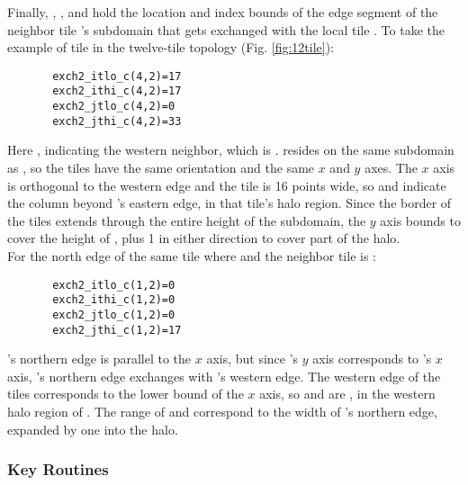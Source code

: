 Finally, ,
,
 and
 hold the location and index
bounds of the edge segment of the neighbor tile 's subdomain
that gets exchanged with the local tile .  To take the example
of tile  in the twelve-tile topology
(Fig. \ref{fig:12tile}): \\

\begin{verbatim}
       exch2_itlo_c(4,2)=17
       exch2_ithi_c(4,2)=17
       exch2_jtlo_c(4,2)=0
       exch2_jthi_c(4,2)=33
\end{verbatim}
 
Here , indicating the western neighbor, which is
.   resides on the same subdomain as , so
the tiles have the same orientation and the same $x$ and $y$ axes.
The $x$ axis is orthogonal to the western edge and the tile is 16
points wide, so  and 
indicate the column beyond 's eastern edge, in that tile's
halo region. Since the border of the tiles extends through the entire
height of the subdomain, the $y$ axis bounds  to
 cover the height of , plus 1 in
either direction to cover part of the halo. \\

For the north edge of the same tile  where  and 
the neighbor tile is :

\begin{verbatim}
       exch2_itlo_c(1,2)=0
       exch2_ithi_c(1,2)=0
       exch2_jtlo_c(1,2)=0
       exch2_jthi_c(1,2)=17
\end{verbatim}
 
's northern edge is parallel to the $x$ axis, but since
's $y$ axis corresponds to 's $x$ axis, 's
northern edge exchanges with 's western edge.  The western
edge of the tiles corresponds to the lower bound of the $x$ axis, so
 and  are , in the 
western halo region of . The range of
 and  correspond to the
width of 's northern edge, expanded by one into the halo. \\


\subsubsection{Key Routines}

